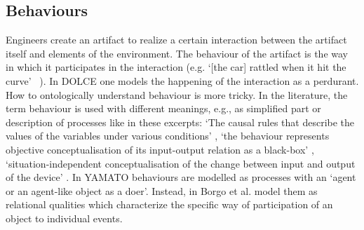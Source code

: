 \documentclass[sw]{iosart2x}
\newcommand{\DOLCE}{\textsc{DOLCE}\xspace} %
\newcommand{\YAMATO}{\textsc{YAMATO}\xspace}
\newcommand{\quotes}[1]{`#1'}
\newcommand{\TODO}[1]{{%
}}
\begin{document}



\subsection{Behaviours}
Engineers create an artifact to realize a certain interaction between the artifact itself and elements of the environment. The behaviour of the artifact is the way in which it participates in the interaction (e.g. \quotes{[the car] rattled when it hit the curve} ~\cite{chandrasekaranFunctionDeviceRepresentation2000}). 
In \DOLCE one models the happening of the interaction as a perdurant. How to ontologically understand behaviour is more tricky. 
In the literature, the term behaviour is used with different meanings, e.g., as simplified part or description of processes like in these excerpts: \quotes{The causal rules that describe the values of the variables under various conditions} \cite{chandrasekaranFunctionDeviceRepresentation2000}, \quotes{the behaviour represents objective conceptualisation of its input-output relation as a black-box} \cite{kitamuraOntologicalModelDevice2006}, \quotes{situation-independent conceptualisation of the change between input and output of the device} \cite{mizoguchiFunctionalOntologyArtifacts2009}. 
In \YAMATO \cite{Mizoguchi2017YAMATOYA} behaviours are modelled as processes with an \quotes{agent or an agent-like object as a doer}. 
Instead, in \cite{borgoFormalOntologicalPerspective2009} Borgo et al.  model them as relational qualities which characterize the specific way of participation of an object to individual events. 
\end{document}
